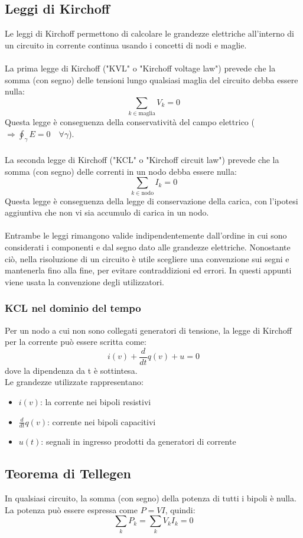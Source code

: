 \documentclass{article}
\begin{document}
\subsection{Leggi di Kirchoff}
Le leggi di Kirchoff permettono di calcolare le grandezze elettriche all'interno di un circuito in corrente continua usando i concetti di nodi e maglie.\\\\
La prima legge di Kirchoff ("KVL" o "Kirchoff voltage law") prevede che la somma (con segno) delle tensioni lungo qualsiasi maglia del circuito debba essere nulla:
$$ \sum_{k\in\text{maglia}} V_k=0 $$
Questa legge è conseguenza della conservatività del campo elettrico ($\Rightarrow\oint_\gamma E=0\quad \forall \gamma$).\\\\
La seconda legge di Kirchoff ("KCL" o  "Kirchoff circuit law") prevede che la somma (con segno) delle correnti in un nodo debba essere nulla:
$$ \sum_{k\in\text{nodo}} I_k=0 $$
Questa legge è conseguenza della legge di conservazione della carica, con l'ipotesi aggiuntiva che non vi sia accumulo di carica in un nodo.\\\\
Entrambe le leggi rimangono valide indipendentemente dall'ordine in cui sono considerati i componenti e dal segno dato alle grandezze elettriche. Nonostante ciò, nella risoluzione di un circuito è utile scegliere una convenzione sui segni e mantenerla fino alla fine, per evitare contraddizioni ed errori. In questi appunti viene usata la convenzione degli utilizzatori.

\subsubsection{KCL nel dominio del tempo}
Per un nodo a cui non sono collegati generatori di tensione, la legge di Kirchoff per la corrente può essere scritta come:
$$ i(v)+\frac{d}{dt}q(v)+u=0 $$
dove la dipendenza da t è sottintesa.\\
Le grandezze utilizzate rappresentano:
\begin{itemize}
    \item $i(v)$: la corrente nei bipoli resistivi
    \item $\frac{d}{dt}q(v)$: corrente nei bipoli capacitivi
    \item $u(t)$: segnali in ingresso prodotti da generatori di corrente
\end{itemize}

\subsection{Teorema di Tellegen}
In qualsiasi circuito, la somma (con segno) della potenza di tutti i bipoli è nulla.\\
La potenza può essere espressa come $P=VI$, quindi:
$$ \sum_kP_k=\sum_kV_kI_k=0 $$
\end{document}
